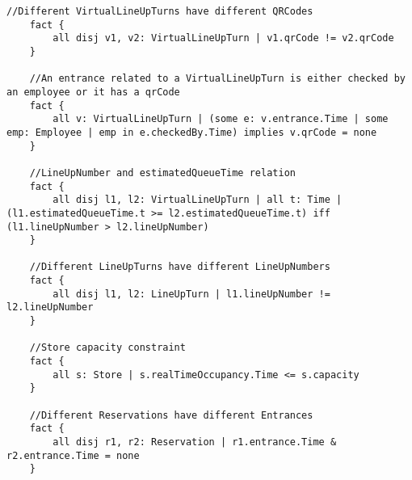 \begin{lstlisting}[language=alloy]
    //Different VirtualLineUpTurns have different QRCodes
    fact {
        all disj v1, v2: VirtualLineUpTurn | v1.qrCode != v2.qrCode
    }

    //An entrance related to a VirtualLineUpTurn is either checked by an employee or it has a qrCode
    fact {
        all v: VirtualLineUpTurn | (some e: v.entrance.Time | some emp: Employee | emp in e.checkedBy.Time) implies v.qrCode = none
    }

    //LineUpNumber and estimatedQueueTime relation
    fact {
        all disj l1, l2: VirtualLineUpTurn | all t: Time | (l1.estimatedQueueTime.t >= l2.estimatedQueueTime.t) iff (l1.lineUpNumber > l2.lineUpNumber)
    }

    //Different LineUpTurns have different LineUpNumbers
    fact {
        all disj l1, l2: LineUpTurn | l1.lineUpNumber != l2.lineUpNumber
    }

    //Store capacity constraint
    fact {
        all s: Store | s.realTimeOccupancy.Time <= s.capacity
    }

    //Different Reservations have different Entrances
    fact {
        all disj r1, r2: Reservation | r1.entrance.Time & r2.entrance.Time = none
    }
    
\end{lstlisting}